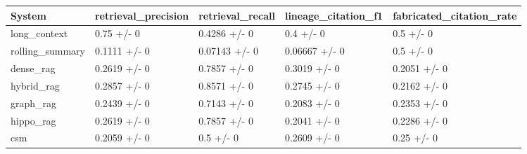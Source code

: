 \begin{tabular}{lllll}
System & retrieval_precision & retrieval_recall & lineage_citation_f1 & fabricated_citation_rate \\
\hline
long\_context & 0.75 +/- 0 & 0.4286 +/- 0 & 0.4 +/- 0 & 0.5 +/- 0 \\
rolling\_summary & 0.1111 +/- 0 & 0.07143 +/- 0 & 0.06667 +/- 0 & 0.5 +/- 0 \\
dense\_rag & 0.2619 +/- 0 & 0.7857 +/- 0 & 0.3019 +/- 0 & 0.2051 +/- 0 \\
hybrid\_rag & 0.2857 +/- 0 & 0.8571 +/- 0 & 0.2745 +/- 0 & 0.2162 +/- 0 \\
graph\_rag & 0.2439 +/- 0 & 0.7143 +/- 0 & 0.2083 +/- 0 & 0.2353 +/- 0 \\
hippo\_rag & 0.2619 +/- 0 & 0.7857 +/- 0 & 0.2041 +/- 0 & 0.2286 +/- 0 \\
csm & 0.2059 +/- 0 & 0.5 +/- 0 & 0.2609 +/- 0 & 0.25 +/- 0 \\
\end{tabular}
